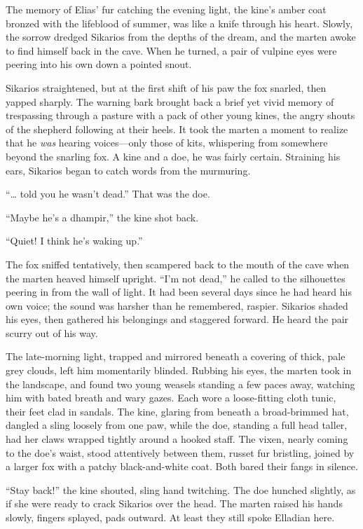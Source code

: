 The memory of Elias' fur catching the evening light, the kine's amber coat bronzed with the lifeblood of summer, was like a knife through his heart. Slowly, the sorrow dredged Sikarios from the depths of the dream, and the marten awoke to find himself back in the cave. When he turned, a pair of vulpine eyes were peering into his own down a pointed snout.

Sikarios straightened, but at the first shift of his paw the fox snarled, then yapped sharply. The warning bark brought back a brief yet vivid memory of trespassing through a pasture with a pack of other young kines, the angry shouts of the shepherd following at their heels. It took the marten a moment to realize that he \emph{was} hearing voices---only those of kits, whispering from somewhere beyond the snarling fox. A kine and a doe, he was fairly certain. Straining his ears, Sikarios began to catch words from the murmuring.

``\ldots{} told you he wasn't dead.'' That was the doe.

``Maybe he's a dhampir,'' the kine shot back.

``Quiet! I think he's waking up.''

The fox sniffed tentatively, then scampered back to the mouth of the cave when the marten heaved himself upright. ``I'm not dead,'' he called to the silhouettes peering in from the wall of light. It had been several days since he had heard his own voice; the sound was harsher than he remembered, raspier. Sikarios shaded his eyes, then gathered his belongings and staggered forward. He heard the pair scurry out of his way.

The late-morning light, trapped and mirrored beneath a covering of thick, pale grey clouds, left him momentarily blinded. Rubbing his eyes, the marten took in the landscape, and found two young weasels standing a few paces away, watching him with bated breath and wary gazes. Each wore a loose-fitting cloth tunic, their feet clad in sandals. The kine, glaring from beneath a broad-brimmed hat, dangled a sling loosely from one paw, while the doe, standing a full head taller, had her claws wrapped tightly around a hooked staff. The vixen, nearly coming to the doe's waist, stood attentively between them, russet fur bristling, joined by a larger fox with a patchy black-and-white coat. Both bared their fangs in silence.

``Stay back!'' the kine shouted, sling hand twitching. The doe hunched slightly, as if she were ready to crack Sikarios over the head. The marten raised his hands slowly, fingers splayed, pads outward. At least they still spoke Elladian here.

